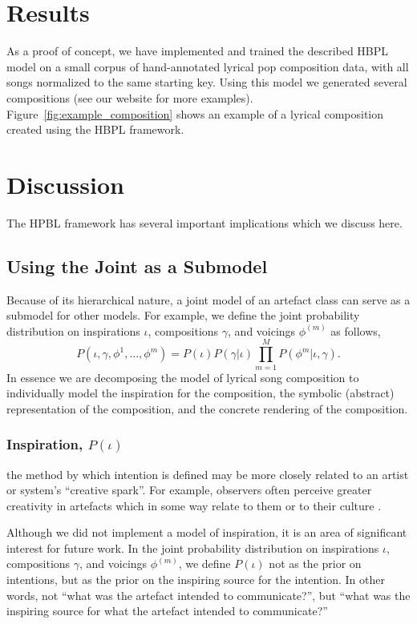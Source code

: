 \documentclass[letterpaper]{article}
\begin{document}
\section{Results}

As a proof of concept, we have implemented and trained the described HBPL model on a small corpus of hand-annotated lyrical pop composition data, with all songs normalized to the same starting key. Using this model we generated several compositions (see our website for more examples). Figure~\ref{fig:example_composition} shows an example of a lyrical composition created using the HBPL framework.

\section{Discussion}

The HPBL framework has several important implications which we discuss here.

\subsection{Using the Joint as a Submodel}

Because of its hierarchical nature, a joint model of an artefact class can serve as a submodel for other models. For example, we define the joint probability distribution on inspirations $\iota$, compositions $\gamma$, and voicings $\phi^{(m)}$ as follows,
\[ P(\iota,\gamma,\phi^1, ..., \phi^m) = P(\iota)P(\gamma|\iota) \prod_{m=1}^M P(\phi^m|\iota,\gamma). \]
In essence we are decomposing the model of lyrical song composition to individually model the inspiration for the composition, the symbolic (abstract) representation of the composition, and the concrete rendering of the composition.

\subsubsection{Inspiration, $P(\iota)$}

the method by which intention is defined may be more closely related to an artist or system's ``creative spark''. For example, observers often perceive greater creativity in artefacts which in some way relate to them or to their culture \cite{colton2008creativity}.

Although we did not implement a model of inspiration, it is an area of significant interest for future work. In the joint probability distribution on inspirations $\iota$, compositions $\gamma$, and voicings $\phi^{(m)}$, we define $P(\iota)$ not as the prior on intentions, but as the prior on the inspiring source for the intention. In other words, not ``what was the artefact intended to communicate?'', but ``what was the inspiring source for what the artefact intended to communicate?''
\end{document}
